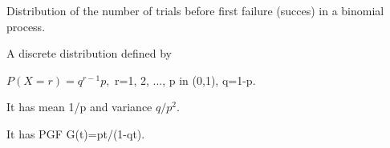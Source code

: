  Distribution of the number of trials before first failure (succes) in a 
binomial process.


\par
 A discrete distribution defined by
\par $P(X=r)=q^{r-1}p,$  r=1, 2, ..., p in (0,1), q=1-p.
\par
It has mean 1/p  and variance $q/p^{2}.$ 
\par
It has PGF G(t)=pt/(1-qt).
